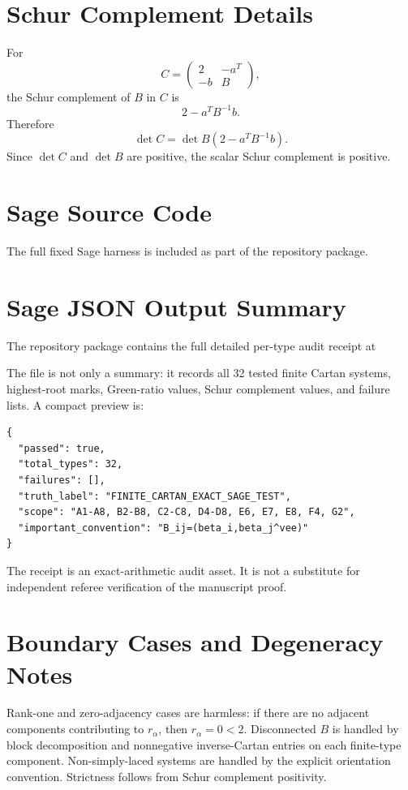 \documentclass[11pt]{book}
\theoremstyle{definition}
\begin{document}
\chapter{Schur Complement Details}
For
\[
 C=\begin{pmatrix}2&-a^T\\-b&B\end{pmatrix},
\]
the Schur complement of $B$ in $C$ is
\[
 2-a^T B^{-1}b.
\]
Therefore
\[
 \det C=\det B(2-a^T B^{-1}b).
\]
Since $\det C$ and $\det B$ are positive, the scalar Schur complement is positive.

\chapter{Sage Source Code}
The full fixed Sage harness is included as part of the repository package.
\begin{center}
\end{center}


\chapter{Sage JSON Output Summary}
The repository package contains the full detailed per-type audit receipt at
\begin{center}
\end{center}
The file is not only a summary: it records all 32 tested finite Cartan systems, highest-root marks, Green-ratio values, Schur complement values, and failure lists. A compact preview is:
\begin{lstlisting}[style=sage]
{
  "passed": true,
  "total_types": 32,
  "failures": [],
  "truth_label": "FINITE_CARTAN_EXACT_SAGE_TEST",
  "scope": "A1-A8, B2-B8, C2-C8, D4-D8, E6, E7, E8, F4, G2",
  "important_convention": "B_ij=(beta_i,beta_j^vee)"
}
\end{lstlisting}
The receipt is an exact-arithmetic audit asset. It is not a substitute for independent referee verification of the manuscript proof.

\chapter{Boundary Cases and Degeneracy Notes}
Rank-one and zero-adjacency cases are harmless: if there are no adjacent components contributing to $r_\alpha$, then $r_\alpha=0<2$. Disconnected $B$ is handled by block decomposition and nonnegative inverse-Cartan entries on each finite-type component. Non-simply-laced systems are handled by the explicit orientation convention. Strictness follows from Schur complement positivity.
\end{document}
